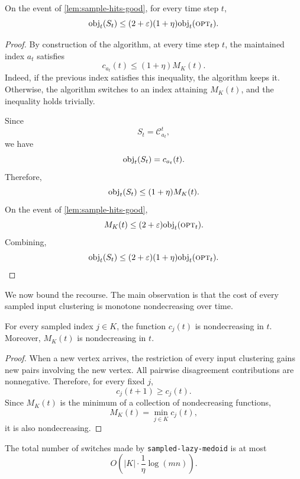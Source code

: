 \begin{lemma}
\label{lem:sampled-lazy-competitive}
On the event of \cref{lem:sample-hits-good}, for every time step \(t\),
\[
    \text{obj}_t(S_t)
    \le
    (2+\varepsilon)(1+\eta)\text{obj}_t(\textsc{opt}_t).
\]
\end{lemma}

\begin{proof}
By construction of the algorithm, at every time step \(t\), the maintained index \(a_t\) satisfies
\[
    c_{a_t}(t)\le (1+\eta)M_K(t).
\]
Indeed, if the previous index satisfies this inequality, the algorithm keeps it. Otherwise, the algorithm switches to an index attaining \(M_K(t)\), and the inequality holds trivially.

Since
\[
    S_t=\mathcal C_{a_t}^t,
\]
we have
\[
    \text{obj}_t(S_t)=c_{a_t}(t).
\]
Therefore,
\[
    \text{obj}_t(S_t)
    \le
    (1+\eta)M_K(t).
\]
On the event of \cref{lem:sample-hits-good},
\[
    M_K(t)
    \le
    (2+\varepsilon)\text{obj}_t(\textsc{opt}_t).
\]
Combining,
\[
    \text{obj}_t(S_t)
    \le
    (2+\varepsilon)(1+\eta)\text{obj}_t(\textsc{opt}_t).
\]
\end{proof}

We now bound the recourse. The main observation is that the cost of every sampled input clustering is monotone nondecreasing over time.

\begin{lemma}
\label{lem:costs-monotone}
For every sampled index \(j\in K\), the function \(c_j(t)\) is nondecreasing in \(t\). Moreover, \(M_K(t)\) is nondecreasing in \(t\).
\end{lemma}

\begin{proof}
When a new vertex arrives, the restriction of every input clustering gains new pairs involving the new vertex. All pairwise disagreement contributions are nonnegative. Therefore, for every fixed \(j\),
\[
    c_j(t+1)\ge c_j(t).
\]
Since \(M_K(t)\) is the minimum of a collection of nondecreasing functions,
\[
    M_K(t)=\min_{j\in K} c_j(t),
\]
it is also nondecreasing.
\end{proof}

\begin{lemma}
\label{lem:sampled-switches}
The total number of switches made by \texttt{sampled-lazy-medoid} is at most
\[
    O\left(
        |K|\cdot \frac{1}{\eta}\log(mn)
    \right).
\]
\end{lemma}

